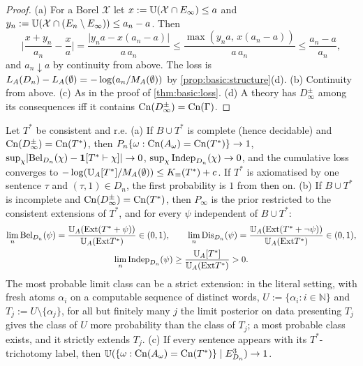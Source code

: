 \begin{proof}
(a) For a Borel $\mathcal X$ let $x:=\mathbb{U}(\mathcal X\cap E_\infty)\le a$ and $y_n:=\mathbb{U}(\mathcal X\cap(E_n\setminus E_\infty))\le a_n-a$. Then
\[
\Big\lvert\frac{x+y_n}{a_n}-\frac xa\Big\rvert=\frac{\lvert y_na-x(a_n-a)\rvert}{a\,a_n}\le\frac{\max(y_na,\,x(a_n-a))}{a\,a_n}\le\frac{a_n-a}{a_n},
\]
and $a_n\downarrow a$ by continuity from above. The loss is $L_{A}(D_n)-L_{A}(\emptyset)=-\log(a_n/M_{A}(\emptyset))$ by \cref{prop:basic:structure}(d). (b) Continuity from above. (c) As in the proof of \cref{thm:basic:loss}. (d) A theory has $D_\infty^\pm$ among its consequences iff it contains $\mathrm{Cn}(D_\infty^\pm)=\mathrm{Cn}(\Gamma)$.
\end{proof}

\begin{proposition}[Limits]\label{prop:basic:limits}
Let $T^*$ be consistent and r.e.
(a) If $B\cup T^*$ is complete (hence decidable) and $\mathrm{Cn}(D_\infty^\pm)=\mathrm{Cn}(T^*)$, then $P_n\{\omega:\mathrm{Cn}(A_\omega)=\mathrm{Cn}(T^*)\}\to1$, $\sup_\chi\lvert\mathrm{Bel}_{D_n}(\chi)-\mathbf{1}[T^*\vdash\chi]\rvert\to0$, $\sup_\chi\mathrm{Indep}_{D_n}(\chi)\to0$, and the cumulative loss converges to $-\log(\mathbb{U}_{A}[T^*]/M_{A}(\emptyset))\le K_{\equiv}(T^*)+c$. If $T^*$ is axiomatised by one sentence $\tau$ and $(\tau,1)\in D_n$, the first probability is $1$ from then on.
(b) If $B\cup T^*$ is incomplete and $\mathrm{Cn}(D_\infty^\pm)=\mathrm{Cn}(T^*)$, then $P_\infty$ is the prior restricted to the consistent extensions of $T^*$, and for every $\psi$ independent of $B\cup T^*$:
\begin{gather*}
\lim_n\mathrm{Bel}_{D_n}(\psi)=\frac{\mathbb{U}_{A}(\mathrm{Ext}(T^*+\psi))}{\mathbb{U}_{A}(\mathrm{Ext} T^*)}\in(0,1),\qquad\lim_n\mathrm{Dis}_{D_n}(\psi)=\frac{\mathbb{U}_{A}(\mathrm{Ext}(T^*+\neg\psi))}{\mathbb{U}_{A}(\mathrm{Ext} T^*)}\in(0,1),\\
\lim_n\mathrm{Indep}_{D_n}(\psi)\ge\frac{\mathbb{U}_{A}[T^*]}{\mathbb{U}_{A}(\mathrm{Ext} T^*)}>0 .
\end{gather*}
The most probable limit class can be a strict extension: in the literal setting, with fresh atoms $\alpha_i$ on a computable sequence of distinct words, $U:=\{\alpha_i:i\in\mathbb N\}$ and $T_j:=U\setminus\{\alpha_j\}$, for all but finitely many $j$ the limit posterior on data presenting $T_j$ gives the class of $U$ more probability than the class of $T_j$; a most probable class exists, and it strictly extends $T_j$.
(c) If every sentence appears with its $T^*$-trichotomy label, then $\mathbb{U}(\{\omega:\mathrm{Cn}(A_\omega)=\mathrm{Cn}(T^*)\}\mid E^3_{D_n})\to1$.
\end{proposition}

